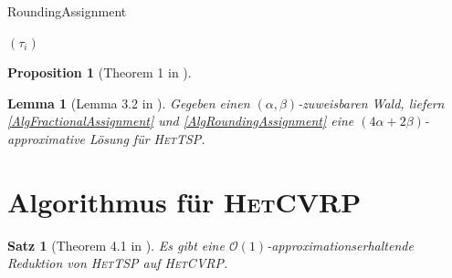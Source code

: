 \documentclass[a4paper,ngerman,12pt,bibtotoc]{scrartcl}
\theoremstyle{definition}
\theoremstyle{plain}
\newtheorem{prop}[defn]{Proposition}
\newtheorem{lemma}[defn]{Lemma}
\newtheorem{satz}[defn]{Satz}
\theoremstyle{remark}
\newcommand{\Oc}{\mathcal{O}}
\newcommand{\HetTSP}{\textsc{HetTSP}}
\newcommand{\HetCVRP}{\textsc{HetCVRP}}
\begin{document}
	\begin{algorithm}
		\caption{RoundingAssignment}\label{AlgRoundingAssignment}
		\begin{algorithmic}[1]
			\State 
			\State \Return $\left(\tau_i\right)$
			\EndProcedure
		\end{algorithmic}
	\end{algorithm}
	
	\begin{prop}[Theorem 1 in \cite{Rounding}]
		
	\end{prop}
	
	\begin{lemma}[Lemma 3.2 in \cite{HetCVRP}]
		Gegeben einen $(\alpha, \beta)$-zuweisbaren Wald, liefern \cref{AlgFractionalAssignment} und \cref{AlgRoundingAssignment} eine $(4\alpha+2\beta)$-approximative Lösung für \HetTSP.
	\end{lemma}
	
	
	\section{Algorithmus für \HetCVRP}
	
	\begin{satz}[Theorem 4.1 in \cite{HetCVRP}]
		Es gibt eine $\Oc(1)$-approximationserhaltende Reduktion von \HetTSP{} auf \HetCVRP.
	\end{satz}

	\newpage
	\nocite{*}
	\printbibliography		
			
\end{document}
